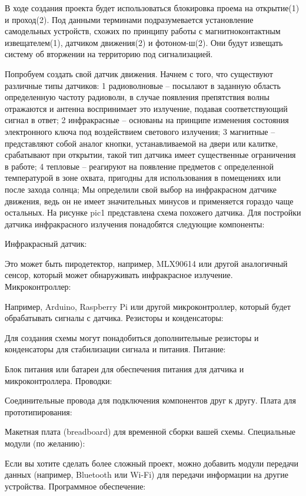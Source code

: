 В ходе создания проекта будет использоваться блокировка проема на открытие(1) и проход(2). Под данными терминами подразумевается установление 
самодельных устройств, схожих по принципу работы с магнитноконтактным извещателем(1), датчиком движения(2) и фотоном-ш(2). Они будут извещать 
систему об вторжении на территорию под сигнализацией. 

Попробуем создать свой датчик движения. Начнем с того, что существуют различные типы датчиков:
1 радиоволновые – посылают в заданную область определенную частоту радиоволн, в случае появления препятствия волны отражаются и антенна воспринимает 
это излучение, подавая соответствующий сигнал в ответ;
2 инфракрасные – основаны на принципе изменения состояния электронного ключа под воздействием светового излучения;
3 магнитные – представляют собой аналог кнопки, устанавливаемой на двери или калитке, срабатывают при открытии, такой тип датчика имеет существенные 
ограничения в работе;
4 тепловые – реагируют на появление предметов с определенной температурой в зоне охвата, пригодны для использования в помещениях или после захода солнца;
Мы определили свой выбор на инфракрасном датчике движения, ведь он не имеет значительных минусов и применяется гораздо чаще остальных. 
На рисунке pic1 представлена схема похожего датчика.
Для постройки датчика инфракрасного излучения понадобятся следующие компоненты:

Инфракрасный датчик:

Это может быть пиродетектор, например, MLX90614 или другой аналогичный сенсор, который может обнаруживать инфракрасное излучение.
Микроконтроллер:

Например, Arduino, Raspberry Pi или другой микроконтроллер, который будет обрабатывать сигналы с датчика.
Резисторы и конденсаторы:

Для создания схемы могут понадобиться дополнительные резисторы и конденсаторы для стабилизации сигнала и питания.
Питание:

Блок питания или батареи для обеспечения питания для датчика и микроконтроллера.
Проводки:

Соединительные провода для подключения компонентов друг к другу.
Плата для прототипирования:

Макетная плата (breadboard) для временной сборки вашей схемы.
Специальные модули (по желанию):

Если вы хотите сделать более сложный проект, можно добавить модули передачи данных (например, Bluetooth или Wi-Fi) для передачи информации на другие устройства.
Программное обеспечение:

